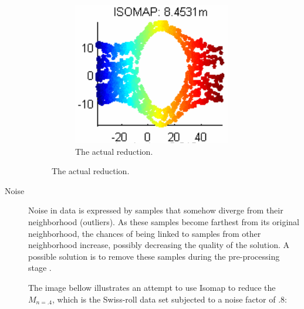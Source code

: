 \documentclass[12pt]{article}
\begin{document}
\begin{description}
\begin{figure}[H]
		\begin{subfigure}[H]{.45\linewidth}
			\includegraphics[width=\linewidth]{img/convexity/actual.png}
			\captionsetup{justification=centering}
			\caption{The actual reduction.}
		\end{subfigure}
	\end{figure}
	
	\newpage
	\item[Noise] Noise in data is expressed by samples that somehow diverge from their neighborhood (outliers). As these samples become farthest from its original neighborhood, the chances of being linked to samples from other neighborhood increase, possibly decreasing the quality of the solution. A possible solution is to remove these samples during the pre-processing stage \cite{herik2009}.
	
	The image bellow illustrates an attempt to use Isomap to reduce the $M_{n=.4}$, which is the Swiss-roll data set subjected to a noise factor of $.8$:
	

\end{description}
\end{document}
